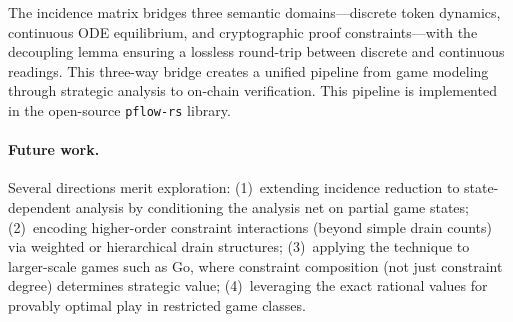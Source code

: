 \documentclass[11pt,a4paper]{article}
\begin{document}
The incidence matrix bridges three semantic domains---discrete token dynamics, continuous ODE equilibrium, and cryptographic proof constraints---with the decoupling lemma ensuring a lossless round-trip between discrete and continuous readings.
This three-way bridge creates a unified pipeline from game modeling through strategic analysis to on-chain verification.
This pipeline is implemented in the open-source \texttt{pflow-rs} library.

\paragraph{Future work.}
Several directions merit exploration:
(1)~extending incidence reduction to state-dependent analysis by conditioning the analysis net on partial game states;
(2)~encoding higher-order constraint interactions (beyond simple drain counts) via weighted or hierarchical drain structures;
(3)~applying the technique to larger-scale games such as Go, where constraint composition (not just constraint degree) determines strategic value;
(4)~leveraging the exact rational values for provably optimal play in restricted game classes.
\end{document}
